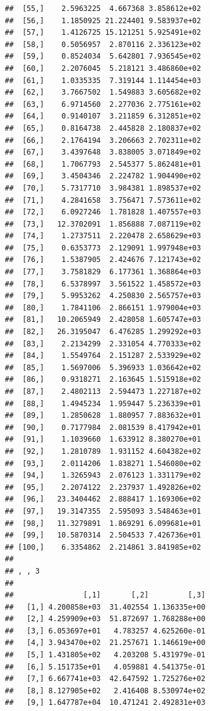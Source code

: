 \documentclass[article]{jss}\usepackage[]{graphicx}\usepackage[]{xcolor}
\makeatletter
\newenvironment{kframe}{%
 \def\at@end@of@kframe{}%
 \ifinner\ifhmode%
  \def\at@end@of@kframe{\end{minipage}}%
  \begin{minipage}{\columnwidth}%
 \fi\fi%
 \def\FrameCommand##1{\hskip\@totalleftmargin \hskip-\fboxsep
 \colorbox{shadecolor}{##1}\hskip-\fboxsep
     \hskip-\linewidth \hskip-\@totalleftmargin \hskip\columnwidth}%
 \MakeFramed {\advance\hsize-\width
   \@totalleftmargin\z@ \linewidth\hsize
   \@setminipage}}%
 {\par\unskip\endMakeFramed%
 \at@end@of@kframe}
\newenvironment{knitrout}{}{} %
\makeatother
\begin{document}
\begin{knitrout}
\begin{kframe}
\begin{verbatim}
##  [55,]    2.5963225  4.667368 3.858612e+02
##  [56,]    1.1850925 21.224401 9.583937e+02
##  [57,]    1.4126725 15.121251 5.925491e+02
##  [58,]    0.5056957  2.870116 2.336123e+02
##  [59,]    0.8524034  5.642801 7.936545e+02
##  [60,]    2.2076045  5.218121 3.486860e+02
##  [61,]    1.0335335  7.319144 1.114454e+03
##  [62,]    3.7667502  1.549883 3.605682e+02
##  [63,]    6.9714560  2.277036 2.775161e+02
##  [64,]    0.9140107  3.211859 6.312851e+02
##  [65,]    0.8164738  2.445828 2.180837e+02
##  [66,]    2.1764194  3.206663 2.702311e+02
##  [67,]    3.4397648  3.838005 3.071849e+02
##  [68,]    1.7067793  2.545377 5.862481e+01
##  [69,]    3.4504346  2.224782 1.904490e+02
##  [70,]    5.7317710  3.984381 1.898537e+02
##  [71,]    4.2841658  3.756471 7.573611e+02
##  [72,]    6.0927246  1.781828 1.407557e+03
##  [73,]   12.3702091  1.856888 7.087119e+02
##  [74,]    1.2737511  2.220478 2.658629e+03
##  [75,]    0.6353773  2.129091 1.997948e+03
##  [76,]    1.5387905  2.424676 7.121743e+02
##  [77,]    3.7581829  6.177361 1.368864e+03
##  [78,]    6.5378997  3.561522 1.458572e+03
##  [79,]    5.9953262  4.250830 2.565757e+03
##  [80,]    1.7841106  2.866151 1.979004e+03
##  [81,]   10.2065949  2.428058 1.605747e+03
##  [82,]   26.3195047  6.476285 1.299292e+03
##  [83,]    2.2134299  2.331054 4.770333e+02
##  [84,]    1.5549764  2.151287 2.533929e+02
##  [85,]    1.5697006  5.396933 1.036642e+02
##  [86,]    0.9318271  2.163645 1.515918e+02
##  [87,]    2.4802113  2.594473 1.227187e+02
##  [88,]    1.4945234  1.959447 5.236339e+01
##  [89,]    1.2850628  1.880957 7.883632e+01
##  [90,]    0.7177984  2.081539 8.417942e+01
##  [91,]    1.1039660  1.633912 8.380270e+01
##  [92,]    1.2810789  1.931152 4.604382e+02
##  [93,]    2.0114206  1.838271 1.546080e+02
##  [94,]    1.3265943  2.076123 1.331179e+02
##  [95,]    2.2074122  2.237937 1.492826e+02
##  [96,]   23.3404462  2.888417 1.169306e+02
##  [97,]   19.3147355  2.595093 3.548463e+01
##  [98,]   11.3279891  1.869291 6.099681e+01
##  [99,]   10.5870314  2.504533 7.426736e+01
## [100,]    6.3354862  2.214861 3.841985e+02
## 
## , , 3
## 
##                [,1]       [,2]         [,3]
##   [1,] 4.200858e+03  31.402554 1.136335e+00
##   [2,] 4.259909e+03  51.872697 1.768288e+00
##   [3,] 6.053697e+01   4.783257 4.625260e-01
##   [4,] 3.943470e+02  21.257671 1.146619e+00
##   [5,] 1.431805e+02   4.203208 5.431979e-01
##   [6,] 5.151735e+01   4.059881 4.541375e-01
##   [7,] 6.667741e+03  42.647592 1.725276e+02
##   [8,] 8.127905e+02   2.416408 8.530974e+02
##   [9,] 1.647787e+04  10.471241 2.492831e+03

\end{verbatim}
\end{kframe}
\end{knitrout}
\end{document}
